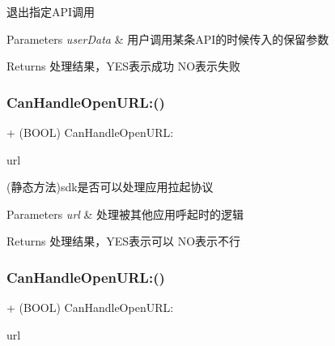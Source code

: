 退出指定\+A\+P\+I调用 
\begin{DoxyParams}{Parameters}
{\em user\+Data} & 用户调用某条\+A\+P\+I的时候传入的保留参数 \\
\hline
\end{DoxyParams}
\begin{DoxyReturn}{Returns}
处理结果，\+Y\+E\+S表示成功 N\+O表示失败 
\end{DoxyReturn}
\mbox{\label{interface_tencent_o_auth_aab5162f1fbcce989d43da562243de69d}} 
\subsubsection{\texorpdfstring{Can\+Handle\+Open\+U\+R\+L\+:()}{CanHandleOpenURL:()}\hspace{0.1cm}{\footnotesize\ttfamily [1/2]}}
{\footnotesize\ttfamily + (B\+O\+OL) Can\+Handle\+Open\+U\+R\+L\+: \begin{DoxyParamCaption}\item[{(N\+S\+U\+RL $\ast$)}]{url }\end{DoxyParamCaption}}

(静态方法)sdk是否可以处理应用拉起协议 
\begin{DoxyParams}{Parameters}
{\em url} & 处理被其他应用呼起时的逻辑 \\
\hline
\end{DoxyParams}
\begin{DoxyReturn}{Returns}
处理结果，\+Y\+E\+S表示可以 N\+O表示不行 
\end{DoxyReturn}
\mbox{\label{interface_tencent_o_auth_aab5162f1fbcce989d43da562243de69d}} 
\subsubsection{\texorpdfstring{Can\+Handle\+Open\+U\+R\+L\+:()}{CanHandleOpenURL:()}\hspace{0.1cm}{\footnotesize\ttfamily [2/2]}}
{\footnotesize\ttfamily + (B\+O\+OL) Can\+Handle\+Open\+U\+R\+L\+: \begin{DoxyParamCaption}\item[{(N\+S\+U\+RL $\ast$)}]{url }\end{DoxyParamCaption}}

